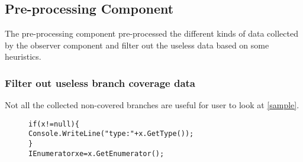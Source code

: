 \subsection{Pre-processing Component}
The pre-processing component pre-processed the different kinds of data collected by the observer component and filter out the useless data based on some heuristics.
\subsubsection{Filter out useless branch coverage data}
Not all the collected non-covered branches are useful for user to look at \ref{sample}. 

\begin{figure}[t]
\begin{CodeOut}
\begin{alltt}

if (x != null) \{
   Console.WriteLine("type: " + x.GetType());
\}
IEnumerator xe = x.GetEnumerator();

\end{alltt}
\end{CodeOut}
\label{fig:intstack}
\end{figure}

